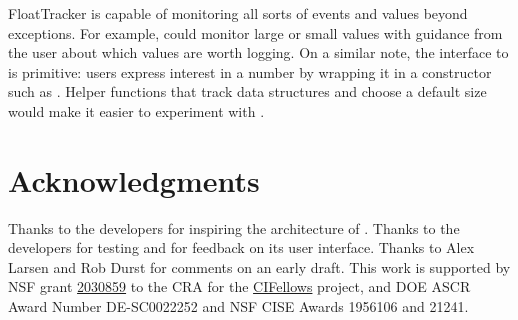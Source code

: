 \documentclass{juliacon}
\begin{document}
FloatTracker is capable of monitoring all sorts of events and \fp{} values beyond exceptions.
For example, \FT{} could monitor large or small values with guidance from the user about which values are worth logging.
On a similar note, the interface to \FT{} is primitive: users express interest in a number by wrapping it
in a constructor such as .
Helper functions that track data structures and choose a default size would
make it easier to experiment with \FT{}.



\section{Acknowledgments}

Thanks to the  developers for inspiring the architecture of \FT{}.
Thanks to the  developers for testing \FT{} and for feedback on its user interface.
Thanks to Alex Larsen and Rob Durst for comments on an early draft.
This work is supported by
NSF grant \href{https://nsf.gov/awardsearch/showAward?AWD_ID=2030859&HistoricalAwards=false}{2030859}
to the CRA for the \href{https://cifellows2020.org}{CIFellows} project,
and DOE ASCR Award Number DE-SC0022252 and NSF CISE Awards 1956106 and 21241.


\end{document}
